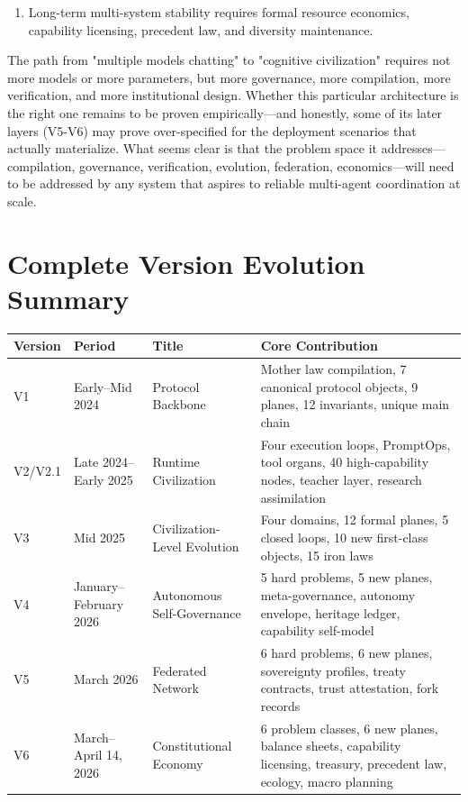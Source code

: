 \documentclass[12pt,a4paper]{article}
\begin{document}
\begin{enumerate}
  \item Long-term multi-system stability requires formal resource economics, capability licensing, precedent law, and diversity maintenance.
\end{enumerate}

The path from "multiple models chatting" to "cognitive civilization" requires not more models or more parameters, but more governance, more compilation, more verification, and more institutional design. Whether this particular architecture is the right one remains to be proven empirically---and honestly, some of its later layers (V5-V6) may prove over-specified for the deployment scenarios that actually materialize. What seems clear is that the problem space it addresses---compilation, governance, verification, evolution, federation, economics---will need to be addressed by any system that aspires to reliable multi-agent coordination at scale.


\appendix
\section{Complete Version Evolution Summary}


\begin{table}[htbp]
\centering
\small
\begin{tabular}{llll}
\toprule
Version & Period & Title & Core Contribution \\
\midrule
V1 & Early--Mid 2024 & Protocol Backbone & Mother law compilation, 7 canonical protocol objects, 9 planes, 12 invariants, unique main chain \\
V2/V2.1 & Late 2024--Early 2025 & Runtime Civilization & Four execution loops, PromptOps, tool organs, 40 high-capability nodes, teacher layer, research assimilation \\
V3 & Mid 2025 & Civilization-Level Evolution & Four domains, 12 formal planes, 5 closed loops, 10 new first-class objects, 15 iron laws \\
V4 & January--February 2026 & Autonomous Self-Governance & 5 hard problems, 5 new planes, meta-governance, autonomy envelope, heritage ledger, capability self-model \\
V5 & March 2026 & Federated Network & 6 hard problems, 6 new planes, sovereignty profiles, treaty contracts, trust attestation, fork records \\
V6 & March--April 14, 2026 & Constitutional Economy & 6 problem classes, 6 new planes, balance sheets, capability licensing, treasury, precedent law, ecology, macro planning \\
\bottomrule
\end{tabular}
\end{table}
\end{document}
